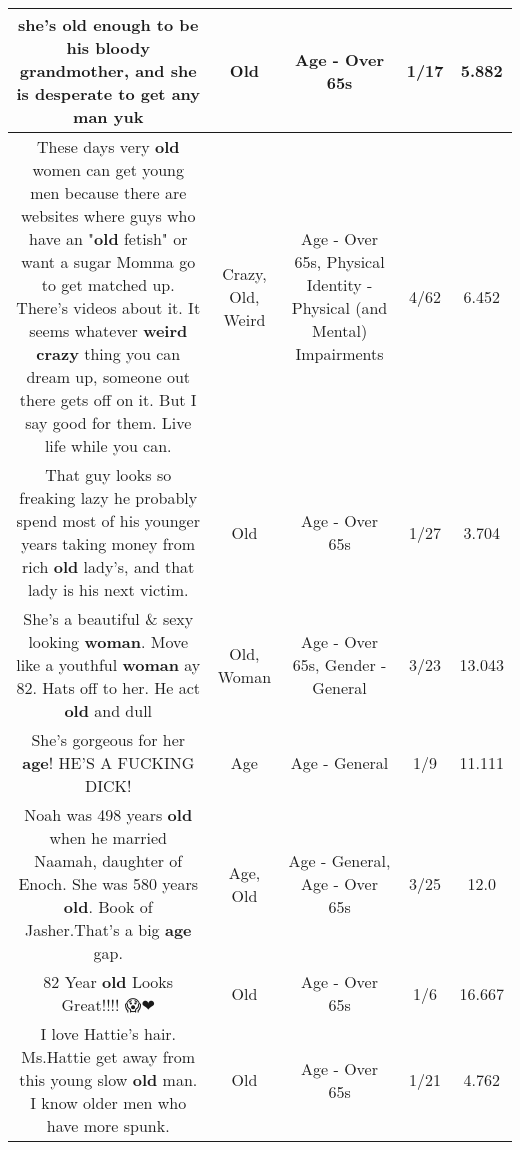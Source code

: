 \documentclass[11pt]{article}
\newlength\mylength
\begin{document}
\begin{center}
\begin{longtable}{|C{.65\mylength}|C{.30\mylength}|C{.12\mylength}|C{.12\mylength}|C{.12\mylength}|}
  \small she's \textbf{old} enough to be his bloody grandmother, and she is desperate to get any man yuk\normalsize   & Old & Age - Over 65s & 1/17 & 5.882 \\  \hline
  \small These days very \textbf{old} women can get young men because there are websites where guys who have an "\textbf{old} fetish" or want a sugar Momma go to get matched up.  There's videos about it.  It seems whatever \textbf{weird} \textbf{crazy} thing you can dream up, someone out there gets off on it.  But I say good for them.  Live life while you can.\normalsize   & Crazy, Old, Weird & Age - Over 65s, Physical Identity - Physical (and Mental) Impairments & 4/62 & 6.452 \\  \hline
  \small That guy looks so freaking lazy he probably spend most of his younger years taking money from rich \textbf{old} lady's, and that lady is his next victim.\normalsize   & Old & Age - Over 65s & 1/27 & 3.704 \\  \hline
  \small She's a beautiful \& sexy looking \textbf{woman}. Move like a youthful \textbf{woman} ay 82. Hats off to her. He act \textbf{old} and dull\normalsize   & Old, Woman & Age - Over 65s, Gender - General & 3/23 & 13.043 \\  \hline
  \small She's gorgeous for her \textbf{age}! HE'S  A FUCKING DICK!\normalsize   & Age & Age - General & 1/9 & 11.111 \\  \hline
  \small Noah was 498 years \textbf{old} when he married Naamah, daughter of Enoch. She was 580 years \textbf{old}. Book of Jasher.That's a big \textbf{age} gap.\normalsize   & Age, Old & Age - General, Age - Over 65s & 3/25 & 12.0 \\  \hline
  \small 82 Year \textbf{old} Looks Great!!!! 😱❤\normalsize   & Old & Age - Over 65s & 1/6 & 16.667 \\  \hline
  \small I love Hattie's hair. Ms.Hattie get away from this young slow  \textbf{old} man. I know older men who have more spunk.\normalsize   & Old & Age - Over 65s & 1/21 & 4.762 \\  \hline

\end{longtable}
\end{center}
\end{document}
